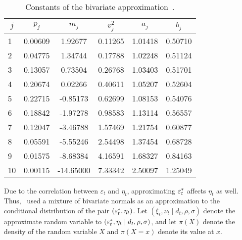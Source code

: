 \begin{table}[t!]
	\centering
	\begin{tabular}{cccccc}
		$j$                       & $p_j$    & $m_j$      & $v_j^2$ & $a_j$    & $b_j$    \\ \hline
		\multicolumn{1}{l|}{1}  & 0.00609 & 1.92677   & 0.11265                & 1.01418 & 0.50710 \\
		\multicolumn{1}{l|}{2}  & 0.04775 & 1.34744   & 0.17788                & 1.02248 & 0.51124 \\
		\multicolumn{1}{l|}{3}  & 0.13057 & 0.73504   & 0.26768                & 1.03403 & 0.51701 \\
		\multicolumn{1}{l|}{4}  & 0.20674 & 0.02266   & 0.40611                & 1.05207 & 0.52604 \\
		\multicolumn{1}{l|}{5}  & 0.22715 & -0.85173  & 0.62699                & 1.08153 & 0.54076 \\
		\multicolumn{1}{l|}{6}  & 0.18842 & -1.97278  & 0.98583                & 1.13114 & 0.56557 \\
		\multicolumn{1}{l|}{7}  & 0.12047 & -3.46788  & 1.57469                & 1.21754 & 0.60877 \\
		\multicolumn{1}{l|}{8}  & 0.05591 & -5.55246  & 2.54498                & 1.37454 & 0.68728 \\
		\multicolumn{1}{l|}{9}  & 0.01575 & -8.68384  & 4.16591                & 1.68327 & 0.84163 \\
		\multicolumn{1}{l|}{10} & 0.00115 & -14.65000 & 7.33342                & 2.50097 & 1.25049
	\end{tabular}
	\caption{Constants of the bivariate approximation~\citep{Omori2007}.}
	\label{tab:constants}
\end{table}

Due to the correlation between $\varepsilon_t$ and $\eta_t$, approximating $\varepsilon_t^\ast$ affects $\eta_t$ as well.
Thus,~\citet{Omori2007} used a mixture of bivariate normals as an approximation to the conditional distribution of the pair $(\varepsilon_t^\ast, \eta_t)$.
Let $(\xi_t,\nu_t\mid d_t,\rho,\sigma)$ denote the approximate random variable to $(\varepsilon_t^\ast,\eta_t\mid d_t,\rho,\sigma)$, and let $\pi(X)$ denote the density of the random variable $X$ and $\pi(X=x)$ denote its value at $x$.

